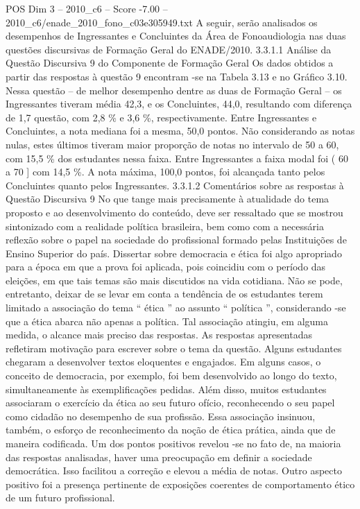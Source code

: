 \begin{textsample}{POS Dim 3 – 2010\_c6 – Score -7.00 – 2010\_c6/enade\_2010\_fono\_c03e305949.txt}
A seguir, serão analisados os desempenhos de Ingressantes e Concluintes da Área de Fonoaudiologia nas duas questões discursivas de Formação Geral do ENADE/2010. 3.3.1.1 Análise da Questão Discursiva 9 do Componente de Formação Geral Os dados obtidos a partir das respostas à questão 9 encontram -se na Tabela 3.13 e no Gráfico 3.10.
Nessa questão – de melhor desempenho dentre as duas de Formação Geral – os Ingressantes tiveram média 42,3, e os Concluintes, 44,0, resultando com diferença de 1,7 questão, com 2,8 \% e 3,6 \%, respectivamente.
Entre Ingressantes e Concluintes, a nota mediana foi a mesma, 50,0 pontos.
Não considerando as notas nulas, estes últimos tiveram maior proporção de notas no intervalo de 50 a 60, com 15,5 \% dos estudantes nessa faixa.
Entre Ingressantes a faixa modal foi ( 60 a 70 ] com 14,5 \%.
A nota máxima, 100,0 pontos, foi alcançada tanto pelos Concluintes quanto pelos Ingressantes. 3.3.1.2 Comentários sobre as respostas à Questão Discursiva 9 No que tange mais precisamente à atualidade do tema proposto e ao desenvolvimento do conteúdo, deve ser ressaltado que se mostrou sintonizado com a realidade política brasileira, bem como com a necessária reflexão sobre o papel na sociedade do profissional formado pelas Instituições de Ensino Superior do país.
Dissertar sobre democracia e ética foi algo apropriado para a época em que a prova foi aplicada, pois coincidiu com o período das eleições, em que tais temas são mais discutidos na vida cotidiana.
Não se pode, entretanto, deixar de se levar em conta a tendência de os estudantes terem limitado a associação do tema “ ética ” ao assunto “ política ”, considerando -se que a ética abarca não apenas a política.
Tal associação atingiu, em alguma medida, o alcance mais preciso das respostas.
As respostas apresentadas refletiram motivação para escrever sobre o tema da questão.
Alguns estudantes chegaram a desenvolver textos eloquentes e engajados.
Em alguns casos, o conceito de democracia, por exemplo, foi bem desenvolvido ao longo do texto, simultaneamente às exemplificações pedidas.
Além disso, muitos estudantes associaram o exercício da ética ao seu futuro ofício, reconhecendo o seu papel como cidadão no desempenho de sua profissão.
Essa associação insinuou, também, o esforço de reconhecimento da noção de ética prática, ainda que de maneira codificada.
Um dos pontos positivos revelou -se no fato de, na maioria das respostas analisadas, haver uma preocupação em definir a sociedade democrática.
Isso facilitou a correção e elevou a média de notas.
Outro aspecto positivo foi a presença pertinente de exposições coerentes de comportamento ético de um futuro profissional.

\end{textsample}

